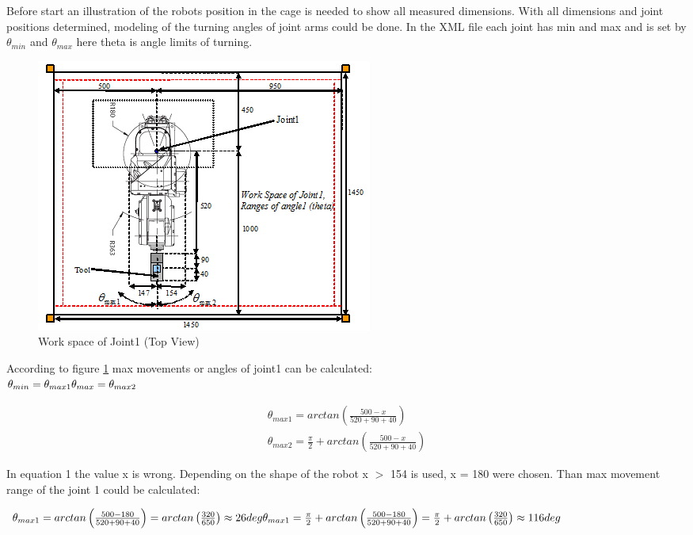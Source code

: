 Before start an illustration of the robots position in the cage is needed to show all measured dimensions. With all dimensions and joint positions determined, modeling of the turning angles of joint arms could be done. In the XML file each joint has min and max and is set by $\theta _{min}$ and $\theta _{max}$ here theta is angle limits of turning.

\begin{figure}[H]
  \centering
  \includegraphics[scale= 1]{source/JointWorkspaceDimensions.png}
  \caption{Work space of Joint1 (Top View)}
  \label{fig:JointWorkspaceDimensions}
\end{figure}

According to figure \ref{fig:JointWorkspaceDimensions} max movements or angles of joint1 can be calculated: \\


$\theta _{min}=\theta _{max1}\\
\theta _{max}=\theta _{max2}$

\begin{align}
\theta _{max1}=arctan\left ( \frac{500-x}{520+90+40} \right ) \label{eq:eq0}\\
\theta _{max2}=\frac{\pi }{2}+arctan\left ( \frac{500-x}{520+90+40} \right )\label{eq:eq1}
\end{align}

In equation 1 the value x is wrong. Depending on the shape of the robot x $>$ 154 is used, x = 180 were chosen. Than max movement range of the joint 1 could be calculated:

$\theta _{max1}=arctan\left ( \frac{500-180}{520+90+40} \right )=arctan\left ( \frac{320}{650} \right )\approx 26deg \\
\theta _{max1}=\frac{\pi }{2}+arctan\left ( \frac{500-180}{520+90+40} \right )=\frac{\pi }{2}+arctan\left ( \frac{320}{650} \right )\approx 116deg$\\


